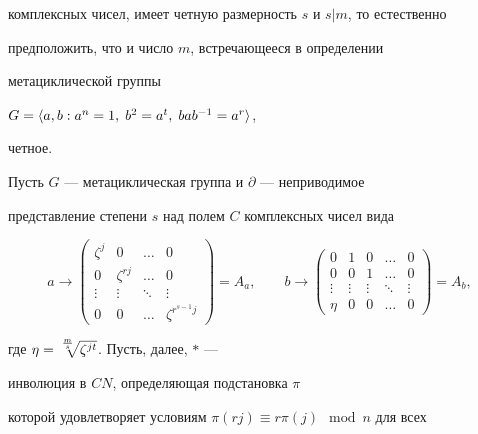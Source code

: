 комплексных чисел, имеет четную размерность $s$ и $s|m$, то естественно


предположить, что и число $m$, встречающееся в определении


метациклической группы


$G=\langle a,b:a^n=1,\;b^2=a^t,\;bab^{-1}=a^r\rangle$,


четное.





\begin{thm}


Пусть $G$ --- метациклическая группа и $\partial$ --- неприводимое


представление степени $s$ над полем $C$ комплексных чисел вида


$$


a\longrightarrow


\begin{pmatrix}


\zeta^j & 0 & \dots & 0 \\


0 & \zeta^{rj} & \dots & 0\\


\vdots & \vdots & \ddots & \vdots \\


0 & 0 & \dots & \zeta^{r^{s-1}j}


\end{pmatrix}


=A_a,\qquad b\longrightarrow


\begin{pmatrix}


0 & 1 & 0 & \dots & 0 \\


0 & 0 & 1 & \dots & 0 \\


\vdots & \vdots & \vdots & \ddots & \vdots \\


\eta & 0 & 0 & \dots & 0


\end{pmatrix}


=A_b,


$$


где $\eta=\sqrt[\uproot{4}{\frac{m}{s}}]{\zeta^{jt}}$. Пусть, далее, $*$ ---


инволюция в $CN$, определяющая подстановка $\pi$


которой удовлетворяет условиям $\pi(rj)\equiv r\pi(j)\mod{n}$ для всех



\end{thm}
